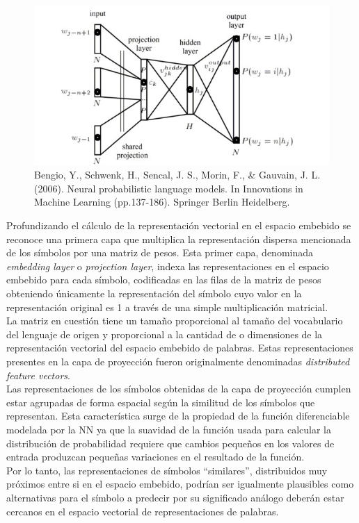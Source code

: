 \documentclass{article}
\begin{document}
	\begin{figure}[H]
		\centering
		\includegraphics[scale=0.5]{nnLanguageModel.jpg}
		\caption{Bengio, Y., Schwenk, H., Sencal, J. S., Morin, F., \& Gauvain, J. L. (2006). 
			Neural probabilistic language models. In Innovations in Machine Learning (pp.137-186). Springer Berlin Heidelberg.}
		\label{nnModelLanguage}
	\end{figure}
	
	Profundizando el cálculo de la representación vectorial en el espacio embebido se reconoce una primera capa que multiplica la representación dispersa mencionada de los símbolos por una matriz de pesos. Esta primer capa, denominada \textit{embedding layer} o \textit{projection layer}, indexa las representaciones en el espacio embebido para cada símbolo, codificadas en las filas de la matriz de pesos obteniendo únicamente la representación del símbolo cuyo valor en la representación original es 1 a través de una simple multiplicación matricial.\\
	La matriz en cuestión tiene un tamaño proporcional al tamaño del vocabulario del lenguaje de origen y proporcional a la cantidad de  o dimensiones de la representación vectorial del espacio embebido de palabras. Estas representaciones presentes en la capa de proyección fueron originalmente denominadas \textit{distributed feature vectors}.\\
	Las representaciones de los símbolos obtenidas de la capa de proyección cumplen estar agrupadas de forma espacial según la similitud de los símbolos que representan. Esta característica surge de la propiedad de la función diferenciable modelada por la NN ya que la suavidad de la función usada para calcular la distribución de probabilidad requiere que cambios pequeños en los valores de entrada produzcan pequeñas variaciones en el resultado de la función. \\
	Por lo tanto, las representaciones de símbolos ``similares'', distribuidos muy próximos entre si en el espacio embebido, podrían ser igualmente plausibles como alternativas para el símbolo a predecir por su significado análogo deberán estar cercanos en el espacio vectorial de representaciones de palabras.\\
	
\end{document}
